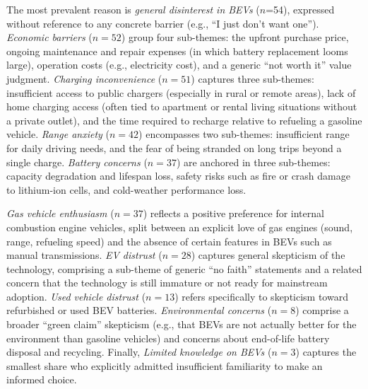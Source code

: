 \documentclass[a4paper,fleqn]{cas-sc}   %
\begin{document}
The most prevalent reason is \textit{general disinterest in BEVs} ($n$=54), expressed without reference to any concrete barrier (e.g., ``I just don't want one''). \textit{Economic barriers} ($n=52$) group four sub-themes: the upfront purchase price, ongoing maintenance and repair expenses (in which battery replacement looms large), operation costs (e.g., electricity cost), and a generic ``not worth it'' value judgment. \textit{Charging inconvenience} ($n=51$) captures three sub-themes: insufficient access to public chargers (especially in rural or remote areas), lack of home charging access (often tied to apartment or rental living situations without a private outlet), and the time required to recharge relative to refueling a gasoline vehicle. \textit{Range anxiety} ($n=42$) encompasses two sub-themes: insufficient range for daily driving needs, and the fear of being stranded on long trips beyond a single charge.  \textit{Battery concerns} ($n=37$) are anchored in three sub-themes: capacity degradation and lifespan loss, safety risks such as fire or crash damage to lithium-ion cells, and cold-weather performance loss.

\textit{Gas vehicle enthusiasm} ($n=37$) reflects a positive preference for internal combustion engine vehicles, split between an explicit love of gas engines (sound, range, refueling speed) and the absence of certain features in BEVs such as manual transmissions. \textit{EV distrust} ($n=28$) captures general skepticism of the technology, comprising a sub-theme of generic ``no faith'' statements and a related concern that the technology is still immature or not ready for mainstream adoption. \textit{Used vehicle distrust} ($n=13$) refers specifically to skepticism toward refurbished or used BEV batteries. \textit{Environmental concerns} ($n=8$) comprise a broader ``green claim'' skepticism (e.g., that BEVs are not actually better for the environment than gasoline vehicles) and concerns about end-of-life battery disposal and recycling. Finally, \textit{Limited knowledge on BEVs} ($n=3$) captures the smallest share who explicitly admitted insufficient familiarity to make an informed choice.
\end{document}
